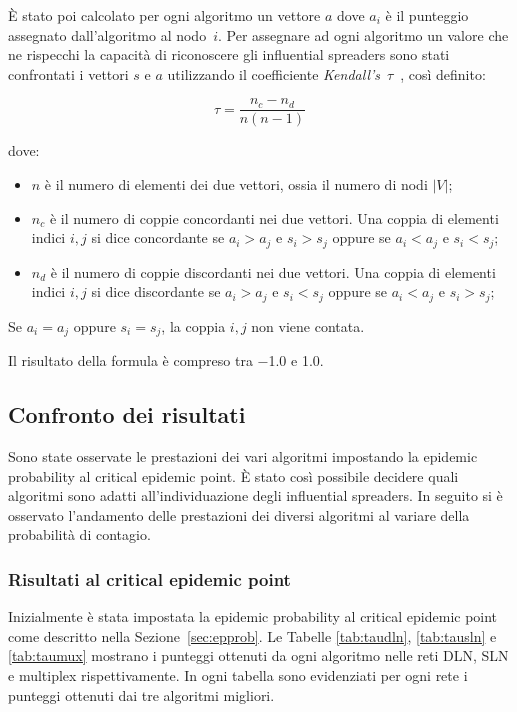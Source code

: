 È stato poi calcolato per ogni algoritmo un vettore $a$ dove $a_i$ 
è il punteggio assegnato dall'algoritmo al nodo~$i$.
Per assegnare ad ogni algoritmo un valore che ne rispecchi la capacità di riconoscere 
gli influential spreaders sono stati confrontati i vettori $s$ e $a$ utilizzando il coefficiente 
\textit{Kendall's}~$\tau$~\cite{kendall:tau}, 
così definito:

\begin{equation}
    \tau = \frac{n_c - n_d}{n(n-1)}
\end{equation}

dove:
\begin{itemize}
    \setlength\itemsep{0pt}
    \item $n$ è il numero di elementi dei due vettori, ossia il numero di nodi $|V|$;
    \item $n_c$ è il numero di coppie concordanti nei due vettori. Una coppia di elementi 
            indici $i, j$ si dice concordante se $a_i > a_j$ e $s_i > s_j$ oppure se $a_i < a_j$ e $s_i < s_j$;
    \item $n_d$ è il numero di coppie discordanti nei due vettori. Una coppia di elementi 
    indici $i, j$ si dice discordante se $a_i > a_j$ e $s_i < s_j$ oppure se $a_i < a_j$ e $s_i > s_j$;    
\end{itemize}

Se $a_i = a_j$ oppure $s_i = s_j$, la coppia $i, j$ non viene contata.

Il risultato della formula è compreso tra \num{-1.0} e {1.0}.

\subsection{Confronto dei risultati}

Sono state osservate le prestazioni dei vari algoritmi impostando la epidemic probability
al critical epidemic point. È stato così possibile decidere quali algoritmi sono adatti 
all'individuazione degli influential spreaders. In seguito si è osservato 
l'andamento delle prestazioni dei diversi algoritmi al variare della 
probabilità di contagio.

\subsubsection{Risultati al critical epidemic point}

Inizialmente è stata impostata la epidemic probability al critical epidemic point come 
descritto nella Sezione~\vref{sec:epprob}.
Le Tabelle \ref{tab:taudln}, \ref{tab:tausln} e \ref{tab:taumux} mostrano i punteggi 
ottenuti da ogni algoritmo nelle reti DLN, SLN e multiplex rispettivamente.
In ogni tabella sono evidenziati per ogni rete i punteggi ottenuti dai tre algoritmi 
migliori. 

